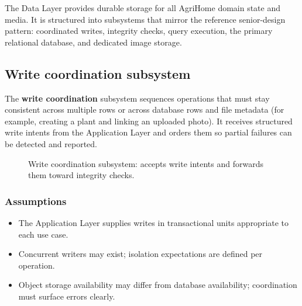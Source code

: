 The Data Layer provides durable storage for all AgriHome domain state and media. It is structured into subsystems that mirror the reference senior-design pattern: coordinated writes, integrity checks, query execution, the primary relational database, and dedicated image storage.

\subsection{Write coordination subsystem}

The \textbf{write coordination} subsystem sequences operations that must stay consistent across multiple rows or across database rows and file metadata (for example, creating a plant and linking an uploaded photo). It receives structured write intents from the Application Layer and orders them so partial failures can be detected and reported.

\begin{figure}[H]
\centering
{}
\caption{Write coordination subsystem: accepts write intents and forwards them toward integrity checks.}
\label{fig:data-write}
\end{figure}

\subsubsection{Assumptions}
\begin{itemize}
  \item The Application Layer supplies writes in transactional units appropriate to each use case.
  \item Concurrent writers may exist; isolation expectations are defined per operation.
  \item Object storage availability may differ from database availability; coordination must surface errors clearly.
\end{itemize}


